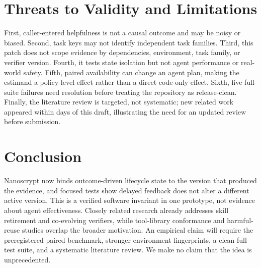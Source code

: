 \documentclass[11pt]{article}
\begin{document}
\section{Threats to Validity and Limitations}
First, caller-entered helpfulness is not a causal outcome and may be noisy or biased. Second, task keys may not identify independent task families. Third, this patch does not scope evidence by dependencies, environment, task family, or verifier version. Fourth, it tests state isolation but not agent performance or real-world safety. Fifth, paired availability can change an agent plan, making the estimand a policy-level effect rather than a direct code-only effect. Sixth, five full-suite failures need resolution before treating the repository as release-clean. Finally, the literature review is targeted, not systematic; new related work appeared within days of this draft, illustrating the need for an updated review before submission.

\section{Conclusion}
Nanoscrypt now binds outcome-driven lifecycle state to the version that produced the evidence, and focused tests show delayed feedback does not alter a different active version. This is a verified software invariant in one prototype, not evidence about agent effectiveness. Closely related research already addresses skill retirement and co-evolving verifiers, while tool-library conformance and harmful-reuse studies overlap the broader motivation. An empirical claim will require the preregistered paired benchmark, stronger environment fingerprints, a clean full test suite, and a systematic literature review. We make no claim that the idea is unprecedented.
\end{document}
